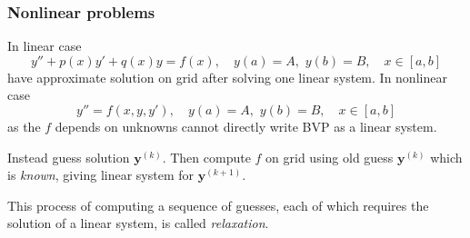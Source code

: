 \documentclass{beamer}
\newcommand{\by}{{\boldsymbol{y}}}
\begin{document}
\begin{frame}
  \frametitle{Nonlinear problems}

  In linear case
  \begin{equation*}
    y'' + p(x) y' + q(x) y =  f(x), \quad y(a) = A, \,\, y(b) = B,
    \quad x \in [a,b]
  \end{equation*}
  have approximate solution on grid after solving one linear
  system. In nonlinear case
  \begin{equation*}
    y'' = f(x, y, y'), \quad y(a) = A, \,\, y(b) = B, \quad x \in [a,b]
  \end{equation*}
  as the $f$ depends on unknowns cannot directly write BVP as a linear
  system. \pause

  \vspace{1ex}

  Instead guess solution $\by^{(k)}$. Then compute $f$ on grid using
  old guess $\by^{(k)}$ which is \emph{known}, giving linear system
  for $\by^{(k+1)}$. \pause

  \vspace{1ex}

  This process of computing a sequence of guesses, each of which
  requires the solution of a linear system, is called
  \emph{relaxation}.

\end{frame}
\end{document}
